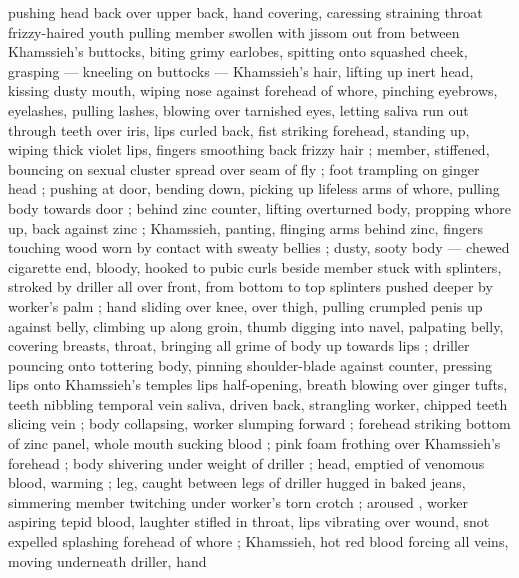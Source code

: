 pushing head back over upper back, hand covering, caressing straining throat {\semislash} frizzy-haired youth pulling member swollen with jissom out from between Khamssieh's buttocks, biting grimy earlobes, spitting onto squashed cheek, grasping --- kneeling on buttocks --- Khamssieh's hair, lifting up inert head, kissing dusty mouth, wiping nose against forehead of whore, pinching eyebrows, eyelashes, pulling lashes, blowing over tarnished eyes, letting saliva run out through teeth over iris, lips curled back, fist striking forehead, standing up, wiping thick violet lips, fingers smoothing back frizzy hair ; member, stiffened, bouncing on sexual cluster spread over seam of fly ; foot trampling on ginger head ; pushing at door, bending down, picking up lifeless arms of whore, pulling body towards door ; behind zinc counter, lifting overturned body, propping whore up, back against zinc ; Khamssieh, panting, flinging arms behind zinc, fingers touching wood worn by contact with sweaty bellies ; dusty, sooty body --- chewed cigarette end, bloody, hooked to pubic curls beside member {\dashcom} stuck with splinters, stroked by driller all over front, from bottom to top {\col} splinters pushed deeper by worker's palm ; hand sliding over knee, over thigh, pulling crumpled penis up against belly, climbing up along groin, thumb digging into navel, palpating belly, covering breasts, throat, bringing all grime of body up towards lips ; driller pouncing onto tottering body, pinning shoulder-blade against counter, pressing lips onto Khamssieh's temples {\col} lips half-opening, breath blowing over ginger tufts, teeth nibbling temporal vein {\col} saliva, driven back, strangling worker, chipped teeth slicing vein ; body collapsing, worker slumping forward ; forehead striking bottom of zinc panel, whole mouth sucking blood ; pink foam frothing over Khamssieh's forehead ; body shivering under weight of driller ; head, emptied of venomous blood, warming ; leg, caught between legs of driller hugged in baked jeans, simmering {\col} member twitching under worker's torn crotch ; aroused , worker aspiring tepid blood, laughter stifled in throat, lips vibrating over wound, snot expelled splashing forehead of whore ; Khamssieh, hot red blood forcing all veins, moving underneath driller, hand 
